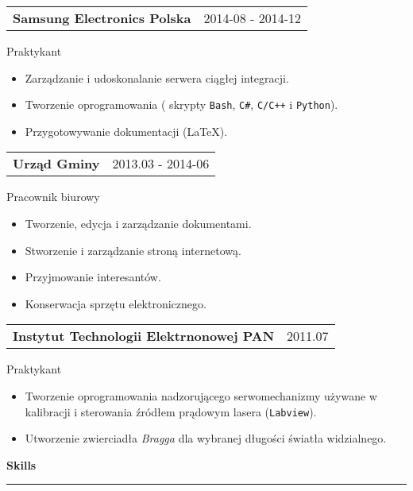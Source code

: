 \documentclass{article}
\begin{document}
\begin{tabular}{@{} m{} R{0.37\textwidth} }
	\textbf{Samsung Electronics Polska}	& {2014-08 - 2014-12} 
\end{tabular}
Praktykant\\
\begin{itemize}
	\item Zarządzanie i udoskonalanie serwera ciągłej integracji.
	\item Tworzenie oprogramowania ( skrypty \texttt{Bash}, \texttt{C\#}, \texttt{C/C++} i \texttt{Python}).
	\item Przygotowywanie dokumentacji (\LaTeX).
\end{itemize}

\begin{tabular}{@{} m{} R{0.37\textwidth} }
\textbf{Urząd Gminy} & {2013.03 - 2014-06} 
\end{tabular}
Pracownik biurowy\\
\begin{itemize}
	\item Tworzenie, edycja i zarządzanie dokumentami.
	\item Stworzenie i zarządzanie stroną internetową.
	\item Przyjmowanie interesantów.
	\item Konserwacja sprzętu elektronicznego.
\end{itemize}

\begin{tabular}{@{} m{} R{0.37\textwidth} }
\textbf{Instytut Technologii Elektrnonowej PAN} & {2011.07} 
\end{tabular}
Praktykant\\
\begin{itemize}
	\item Tworzenie oprogramowania nadzorującego serwomechanizmy używane w kalibracji i sterowania źródłem prądowym lasera (\texttt{Labview}).
	\item Utworzenie zwierciadła \emph{Bragga} dla wybranej długości światła widzialnego.
\end{itemize}

\textbf{\large Skills}
\vspace{0.005\textheight}
\hrule 
\end{document}
